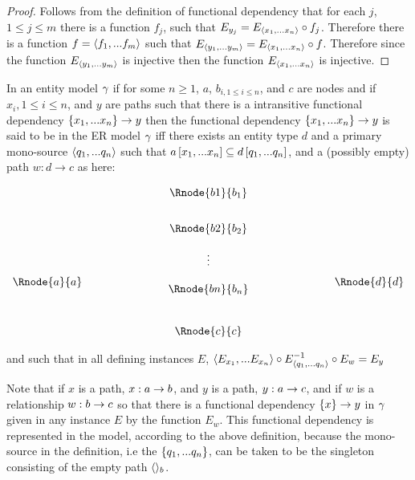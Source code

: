 \begin{proof}
Follows from the definition of functional dependency that for each $j$, $1 \leq j \leq m$  there is a function ${f_j}$,  such that
$E_{y_j}=E_{\langle x_1,...x_n\rangle}\circ f_j$. Therefore there is a function $f=\langle f_1,...f_m\rangle$ such that
$E_{\langle y_1,...y_m\rangle}= E_{\langle x_1,...x_n\rangle}\circ f $. Therefore since  the function $E_{\langle y_1,...y_{m}\rangle}$ is 
injective then the function $E_{\langle x_1,...x_n\rangle}$  is injective.
\end{proof}

\begin{definition}
\noindent In an entity model $\gamma$  
if for some $n \geq 1$, $a$, $b_{i, 1 \leq i \leq n}$,  and $c$ are nodes and 
if  $x_{i}, 1 \leq i \leq n$, and $y$ are paths such
that there is a intransitive functional dependency $\{x_1,...x_n\} \rightarrow y$
 then the functional dependency $\{x_1,...x_n\} \rightarrow y$ is said to be  in the ER model $\gamma$ iff  there exists an entity type $d$ and a primary mono-source
$\langle q_1,...q_n\rangle$  such that $a\left[x_1,...x_n\right]\subseteq d\left[q_1,...q_n\right]$, and a (possibly empty)
path $w:d\rightarrow c$ as here:

\setlength{\arraycolsep}{.2cm}
\begin{center}
$
\begin{array}{cp{2cm}c p{2cm} c}
             &  & \Rnode{b1}{b_1} & &               \\ [0.7cm]
						 &  & \Rnode{b2}{b_2} & &               \\ [0.4cm]
						 &  &     \vdots      & &               \\ [0.2cm]
\Rnode{a}{a} &  &                 & & \Rnode{d}{d}  \\ [-0.2cm]
             &  & \Rnode{bn}{b_n} & &               \\ [0.9cm]
             &  & \Rnode{c}{c}    & &               \\
\end{array}
$
\end{center}

and such that in all defining instances $E$, 
$\langle E_{x_1},...E_{x_n}\rangle \circ E^{-1}_{\langle q_1,...q_n\rangle}\circ E_w = E_y$
\end{definition}

Note that  if $x$ is a path, $x:a \rightarrow b$, and $y$ is a path, $y: a \rightarrow c$, and if $w$ is a
relationship $w: b \rightarrow c$ so that there is a functional dependency $\left\{x\right\} \rightarrow y$ in $\gamma$
given in any instance $E$ by the function $E_w$. This functional dependency is represented in the model, according to the above definition, because the mono-source in the definition, i.e the $\left\{q_1,...q_n\right\}$,
can be taken to be the singleton consisting of the empty path $\langle\rangle_b$. \\

